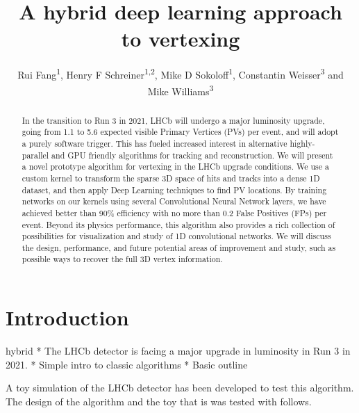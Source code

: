 \documentclass[a4paper]{jpconf}
\begin{document}
\title{A hybrid deep learning approach to vertexing}

\author{
   Rui Fang\textsuperscript{1},
   Henry F Schreiner\textsuperscript{1,2},
   Mike D Sokoloff\textsuperscript{1},
   Constantin Weisser\textsuperscript{3} and
   Mike Williams\textsuperscript{3}
}

\address{
    \textsuperscript{1} University of Cincinnati, Cincinnati, OH, United States
}
\address{
    \textsuperscript{2} Princeton University, Princeton, NJ, United States
}
\address{
    \textsuperscript{3} Massachusetts Institute of Technology, Cambridge, MA, United States
}


\begin{abstract}
In the transition to Run 3 in 2021, LHCb will undergo a major luminosity upgrade, going from 1.1 to 5.6 expected visible Primary Vertices (PVs) per event, and will adopt a purely software trigger. This has fueled increased interest in alternative highly-parallel and GPU friendly algorithms for tracking and reconstruction. We will present a novel prototype algorithm for vertexing in the LHCb upgrade conditions.
We use a custom kernel to transform the sparse 3D space of hits and tracks into a dense 1D dataset, and then apply Deep Learning techniques to find PV locations. By training networks on our kernels using several Convolutional Neural Network layers, we have achieved better than 90\% efficiency with no more than 0.2 False Positives (FPs) per event. Beyond its physics performance, this algorithm also provides a rich collection of possibilities for visualization and study of 1D convolutional networks. We will discuss the design, performance, and future potential areas of improvement and study, such as possible ways to recover the full 3D vertex information.
\end{abstract}


\section{Introduction}

\begin{markdown}{hybrid}
* The LHCb detector is facing a major upgrade in luminosity in Run 3 in 2021.
* Simple intro to classic algorithms
* Basic outline
\end{markdown}

A toy simulation of the LHCb detector has been developed to test this algorithm. The design of the algorithm and the toy that is was tested with follows.
\end{document}
